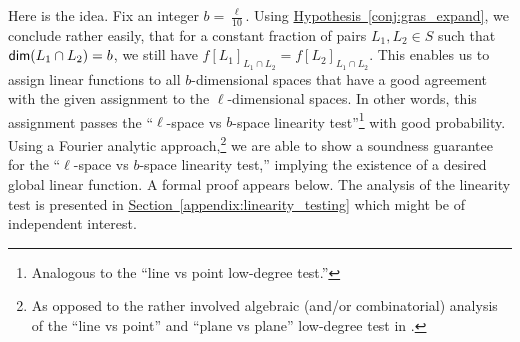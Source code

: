 \documentclass[11pt]{article}
\numberwithin{equation}{section}
\theoremstyle{definition}
\theoremstyle{plain}
\newcommand{\expref}[2]{\hyperref[#2]{#1~\ref{#2}}}
\begin{document}
\smallskip
Here is the idea. Fix an integer $b = \frac{\ell}{10}$.
Using \expref{Hypothesis}{conj:gras_expand}, we conclude rather easily, that for a 
constant fraction of
pairs $L_1, L_2 \in S$ such that  ${\sf dim} (L_1 \cap L_2) = b$, we still have  
$f[L_1]_{L_1 \cap L_2} = f[L_2]_{L_1 \cap L_2}$.
This enables us to assign linear functions to
all %
$b$-dimensional
spaces that have a good agreement with the given assignment to
the %
$\ell$-dimensional spaces.
In other words, this assignment passes
 the ``$\ell$-space vs $b$-space linearity test''\footnote{Analogous to the ``line vs point low-degree test.''}
with good probability. Using a Fourier analytic approach,\footnote{As opposed to
 the rather involved algebraic (and/or combinatorial) analysis of the ``line vs point'' and ``plane vs plane'' low-degree test in \cite{AS98, RS97}. }
we are able to show a soundness guarantee for the ``$\ell$-space vs $b$-space linearity test,''
implying the existence of a desired global linear function. A formal proof appears below.
The analysis of the linearity test is presented in \expref{Section}{appendix:linearity_testing} which might be of independent interest.


\smallskip
\end{document}
